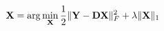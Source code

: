 \documentclass{standalone}
\begin{document}
$ \displaystyle
\mathbf{X} = \arg\min_{\mathbf{X}} \frac{1}{2} \|\mathbf{Y} - \mathbf{D} \mathbf{X}\|_F^2 + \lambda \|\mathbf{X}\|_1
$
\end{document}

